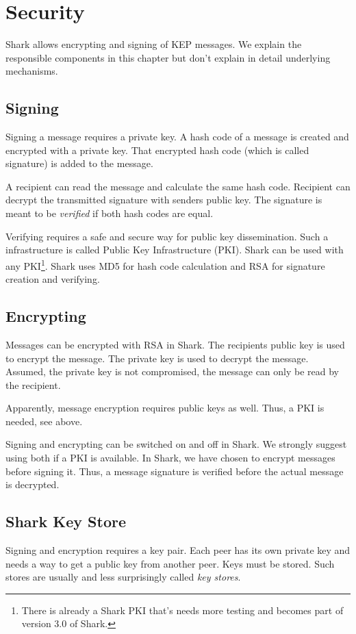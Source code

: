 \chapter{Security}
\label{sec:security}
Shark allows encrypting and signing of KEP messages. We explain the responsible components in this chapter but don't explain in detail underlying mechanisms.

\section{Signing}
Signing a message requires a private key. A hash code of a message is created and encrypted with a private key. That encrypted hash code (which is called signature) is added to the message.

A recipient can read the message and calculate the same hash code. Recipient can decrypt the transmitted signature with senders public key. The signature is meant to be {\it verified} if both hash codes are equal.

Verifying requires a safe and secure way for public key dissemination. Such a infrastructure is called Public Key Infrastructure (PKI). Shark can be used with any PKI\footnote{There is already a Shark PKI that's needs more testing and becomes part of version 3.0 of Shark.}. Shark uses MD5 for hash code calculation and RSA for signature creation and verifying.

\section{Encrypting}
Messages can be encrypted with RSA in Shark. The recipients public key is used to encrypt the message. The private key is used to decrypt the message. Assumed, the private key is not compromised, the message can only be read by the recipient.

Apparently, message encryption requires public keys as well. Thus, a PKI is needed, see above.

Signing and encrypting can be switched on and off in Shark. We strongly suggest using both if a PKI is available. In Shark, we have chosen to encrypt messages before signing it. Thus, a message signature is verified before the 
actual message is decrypted.

\section{Shark Key Store}
Signing and encryption requires a key pair. Each peer has its own private key and needs a way to get a public key from another peer. Keys must be stored. Such stores are usually and less surprisingly called {\it key stores}.

